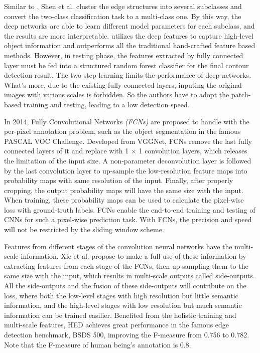 \documentclass[senior]{IPSstyle}
\begin{document}
Similar to \cite{Lim2013}, Shen et al.\cite{Shen2015} cluster the edge structures into several subclasses and convert the two-class classification task to a multi-class one. By this way, the deep networks are able to learn different model parameters for each subclass, and the results are more interpretable. \cite{Shen2015} utilizes the deep features to capture high-level object information and outperforms all the traditional hand-crafted feature based methods. However, in testing phase, the features extracted by fully connected layer must be fed into a structured random forest classifier\cite{Dollar2013} for the final contour detection result. The two-step learning limits the performance of deep networks. What's more, due to the existing fully connected layers, inputing the original images with various scales is forbidden. So the authors\cite{Shen2015} have to adopt the patch-based training and testing, leading to a low detection speed.

In 2014, Fully Convolutional Networks \emph{(FCNs)}\cite{Long2015} are proposed to handle with the per-pixel annotation problem, such as the object segmentation in the famous PASCAL VOC Challenge\cite{Everingham2010}. Developed from VGGNet, FCNs remove the last fully connected layers of it and replace with 1 \(\times\) 1 convolution layers, which releases the limitation of the input size. A non-parameter deconvolution layer is followed by the last convolution layer to up-sample the low-resolution feature maps into probability maps with same resolution of the input. Finally, after properly cropping, the output probability maps will have the same size with the input. When training, these probability maps can be used to calculate the pixel-wise loss with ground-truth labels. FCNs enable the end-to-end training and testing of CNNs for such a pixel-wise prediction task. With FCNs, the precision and speed will not be restricted by the sliding window scheme. 

Features from different stages of the convolution neural networks have the multi-scale information\cite{Xie2015}. Xie et al.\cite{Xie2015} propose to make a full use of these information by extracting features from each stage of the FCNs, then up-sampling them to the same size with the input, which results in multi-scale outputs called side-outputs. All the side-outputs and the fusion of these side-outputs will contribute on the loss, where both the low-level stages with high resolution but little semantic information, and the high-level stages with low resolution but much semantic information can be trained easilier. Benefited from the holistic training and multi-scale features, HED\cite{Xie2015} achieves great performance in the famous edge detection benchmark, BSDS 500\cite{Arbelaez2011}, improving the F-measure\cite{Arbelaez2011} from 0.756\cite{Shen2015} to 0.782. Note that the F-measure of human being's annotation is 0.8.
\end{document}
